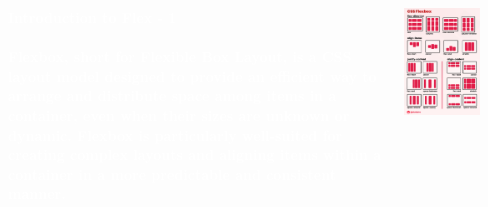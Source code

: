 \documentclass[aspectratio=169, table]{beamer}
\begin{document}
\begin{frame3}
    \vskip1cm
    \begin{tcolorbox}[standard jigsaw, opacityback=0, opacityframe=0, sharp corners, boxrule=0pt]
        \begin{columns}[T] %
            \begin{column}{0.5\textwidth}	
		\textbf{\huge{\textcolor{white}{Introduction to Flex - 1\\}}}
                \textbf{\textcolor{white}{\\Flexbox, short for Flexible Box Layout, is a CSS layout model designed to provide an efficient way to arrange and distribute space among items in a container, even when their sizes are unknown or dynamic. Flexbox is particularly well-suited for creating complex layouts and aligning items within a container in a more predictable and consistent manner.}}
            \end{column}
            \begin{column}{0.5\textwidth}
		\begin{center}
                	\includegraphics[width=0.7\textwidth]{classFiles/flexbox-guideline.png}
		\end{center}
            \end{column}
        \end{columns}
    \end{tcolorbox}
\end{frame3}
\end{document}
